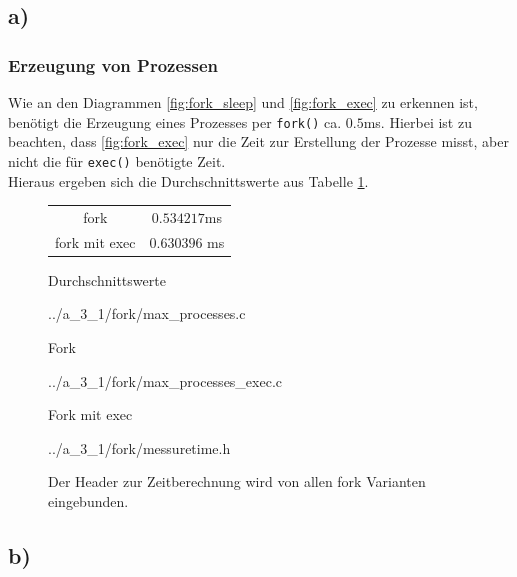 \documentclass[a4paper,
12pt,
BCOR12mm,
]{scrartcl}
\begin{document}
\subsection*{a)}
\subsubsection*{Erzeugung von Prozessen}
Wie an den Diagrammen \ref{fig:fork_sleep} und \ref{fig:fork_exec} zu erkennen ist,
benötigt die Erzeugung eines Prozesses per \verb|fork()| ca. $0.5$ms.
Hierbei ist zu beachten, dass \ref{fig:fork_exec} nur die Zeit zur Erstellung der Prozesse
misst, aber nicht die für \verb|exec()| benötigte Zeit. \\
Hieraus ergeben sich die Durchschnittswerte aus Tabelle \ref{fig:fork_mean}.
 \begin{figure}[h!] 
	\begin{center}
		\begin{tabular}[h!]{c|c}
			\hline
			fork & $0.534217$ms	 \\
			fork mit exec & $0.630396$ ms\\
			\hline
		\end{tabular}
	\end{center}
	\caption{Durchschnittswerte}
	\label{fig:fork_mean}
\end{figure}


\begin{figure}[h!]
	\begin{center}
		 {../a_3_1/fork/max_processes.c}
	\end{center}
	\caption{Fork}
	\label{fig:fork_listing}
\end{figure} 

\begin{figure}[h!]
	\begin{center}
		 {../a_3_1/fork/max_processes_exec.c}
	\end{center}
	\caption{Fork mit exec}
	\label{fig:fork_exec_listing}
\end{figure}

\begin{figure}[h!]
	\begin{center}
		 {../a_3_1/fork/messuretime.h}
	\end{center}
	\caption{Der Header zur Zeitberechnung wird von allen fork Varianten eingebunden.}
	\label{fig:messuretime}
\end{figure}
\subsection*{b)}
\end{document}
